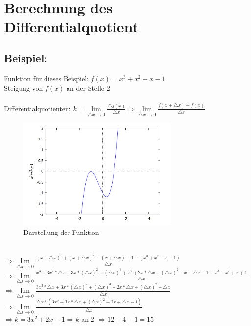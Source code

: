 \documentclass[../mainfile.tex]{article}
\begin{document}
	\section{Berechnung des Differentialquotient}
	\subsection*{Beispiel:}
	Funktion für dieses Beispiel: $f(x) = x^{3} + x^{2} - x - 1$\\
	Steigung von $f(x)$ an der Stelle 2\\
	\\
	Differentialquotienten: $k = \lim\limits_{\triangle x \rightarrow 0}{\frac{\triangle f(x)}{\triangle x}} \Rightarrow \lim\limits_{\triangle x \rightarrow 0}{\frac{f(x+\triangle x)-f(x)}{\triangle x}}$
	\begin{figure}[h] 
		\centering
		\includegraphics[width=8cm]{./swahl/img/graph2.jpg}
		\caption{Darstellung der Funktion}
	\end{figure}
	\\
	$\Rightarrow \lim\limits_{\triangle x \rightarrow 0}{\frac{(x+ \triangle x)^{3} + (x + \triangle x)^{2} - (x+ \triangle x) - 1 - (x^{3} + x^{2} - x - 1)}{\triangle x}}$\\
	$\Rightarrow \lim\limits_{\triangle x \rightarrow 0}{\frac{x^{3}+3x^{2}*\triangle x + 3x*(\triangle x)^{2} + (\triangle x)^{3}+ x^{2} + 2x*\triangle x + (\triangle x)^{2} - x - \triangle x -1 -x^{3} - x^{2} + x + 1 }{\triangle x}}$
	\\
	$\Rightarrow \lim\limits_{\triangle x \rightarrow 0}{\frac{3x^{2} * \triangle x + 3x * (\triangle x)^{2} + (\triangle x)^{3} + 2x * \triangle x + (\triangle x)^{2} - \triangle x}{\triangle x}}$
	\\
	$\Rightarrow \lim\limits_{\triangle x \rightarrow 0}{\frac{\triangle x * (3x^{2} + 3x * \triangle x + (\triangle x)^{2} + 2x+ \triangle x - 1) }{\triangle x}}$
	\\
	$\Rightarrow k = 3x^{2} + 2x - 1 \Rightarrow k$ an $2$ $\Rightarrow 12 + 4 - 1 = 15$
\end{document}
